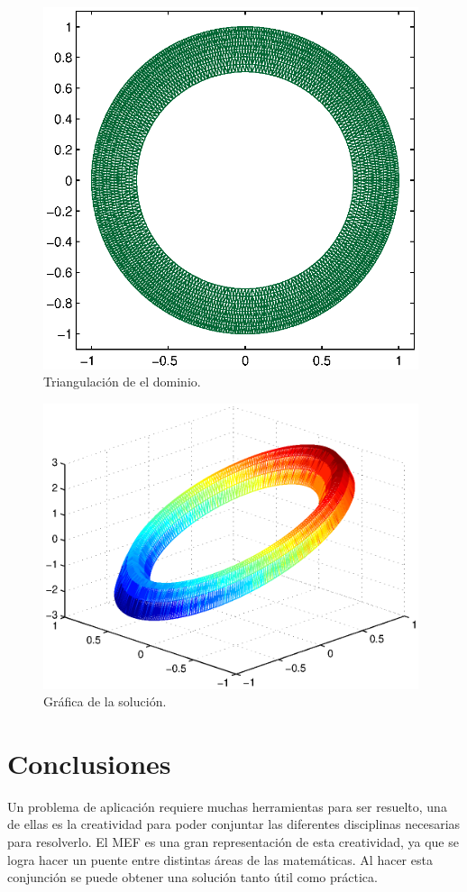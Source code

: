 \documentclass[12pt,spanish,oneside]{book}
\theoremstyle{plain}
\numberwithin{equation}{chapter}
\theoremstyle{definition}
\theoremstyle{remark}
\begin{document}
\begin{figure}[H]
\centering
\includegraphics[width=11cm]{img/triang.eps}
\caption{Triangulación de el dominio.}
\label{fig:triang}
\end{figure}
\begin{figure}[H]
\centering
\includegraphics[width=11cm]{img/u3a.eps}
\caption{Gráfica de la solución.}
\label{fig:solucion}
\end{figure}


\chapter{Conclusiones}

\vspace{2 cm}

Un problema de aplicación requiere muchas herramientas para ser resuelto, una de ellas es la creatividad para poder conjuntar las diferentes disciplinas necesarias para resolverlo. El MEF es una gran representación de esta creatividad, ya que se logra hacer un puente entre distintas áreas de las matemáticas. Al hacer esta conjunción se puede obtener una solución tanto útil como práctica.
\end{document}
